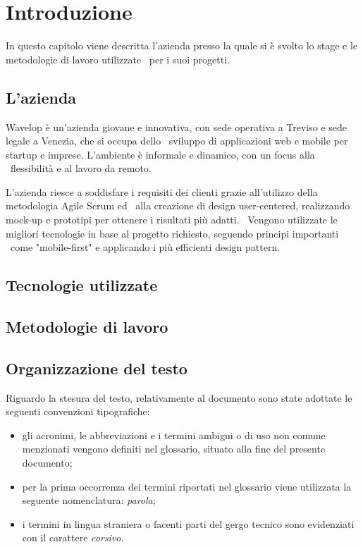 
\chapter{Introduzione}
\label{cap:introduzione}
In questo capitolo viene descritta l’azienda presso la quale si è svolto lo stage e le metodologie di lavoro utilizzate \
per i suoi progetti.

\section{L'azienda}

Wavelop è un’azienda giovane e innovativa, con sede operativa a Treviso e sede legale a Venezia, che si occupa dello \
sviluppo di applicazioni web e mobile per startup e imprese. L’ambiente è informale e dinamico, con un focus alla \
flessibilità e al lavoro da remoto. \

L’azienda riesce a soddisfare i requisiti dei clienti grazie all’utilizzo della metodologia Agile Scrum ed \
alla creazione di design user-centered, realizzando {mock-up} e prototipi per ottenere i risultati più adatti. \
Vengono utilizzate le migliori tecnologie in base al progetto richiesto, seguendo principi importanti \
come "mobile-first" e applicando i più efficienti design pattern.

\section{Tecnologie utilizzate}


\section{Metodologie di lavoro}

\section{Organizzazione del testo}


Riguardo la stesura del testo, relativamente al documento sono state adottate le seguenti convenzioni tipografiche:
\begin{itemize}
	\item gli acronimi, le abbreviazioni e i termini ambigui o di uso non comune menzionati vengono definiti nel glossario, situato alla fine del presente documento;
	\item per la prima occorrenza dei termini riportati nel glossario viene utilizzata la seguente nomenclatura: \emph{parola}\glsfirstoccur;
	\item i termini in lingua straniera o facenti parti del gergo tecnico sono evidenziati con il carattere \emph{corsivo}.
\end{itemize}